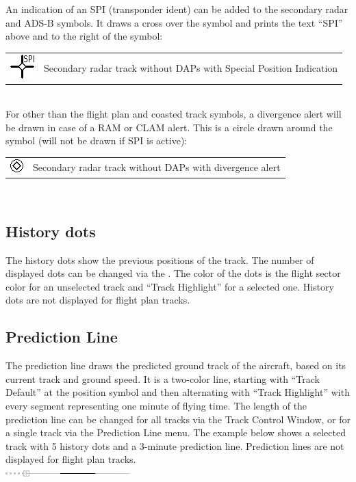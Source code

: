 \documentclass[11pt,a4paper,oldfontcommands]{memoir}
\begin{document}
An indication of an SPI (transponder ident) can be added to the secondary radar and ADS-B symbols. It
draws a cross over the symbol and prints the text “SPI” above and to the right of the symbol:\\
\begin{tabular}{p{5cm}p{5cm}}
\includegraphics{img/rps_spi.png} & Secondary radar track without DAPs with Special Position Indication
\end{tabular}\\
For other than the flight plan and coasted track symbols, a divergence alert will be drawn in case of a RAM
or CLAM alert. This is a circle drawn around the symbol (will not be drawn if SPI is active):\\
\begin{tabular}{p{5cm}p{5cm}}
\includegraphics{img/rps_divalert.png}& Secondary radar track without DAPs with divergence alert
\end{tabular}\\

\subsection{History dots}
The history dots show the previous positions of the track. The number of displayed dots can be changed via
the \textit{}. The color of the dots is the flight sector color for an unselected track and “Track
Highlight” for a selected one. History dots are not displayed for flight plan tracks.\\

\subsection{Prediction Line}
The prediction line draws the predicted ground track of the aircraft, based on its current track and ground
speed. It is a two-color line, starting with “Track Default” at the position symbol and then alternating with “Track Highlight” with every segment representing one minute of flying time. The length of the prediction line can be
changed for all tracks via the Track Control Window, or for a single track via the Prediction Line menu. The
example below shows a selected track with 5 history dots and a 3-minute prediction line. Prediction lines
are not displayed for flight plan tracks.\\
\includegraphics{img/rps_predline+history_selected.png}\\
\end{document}
